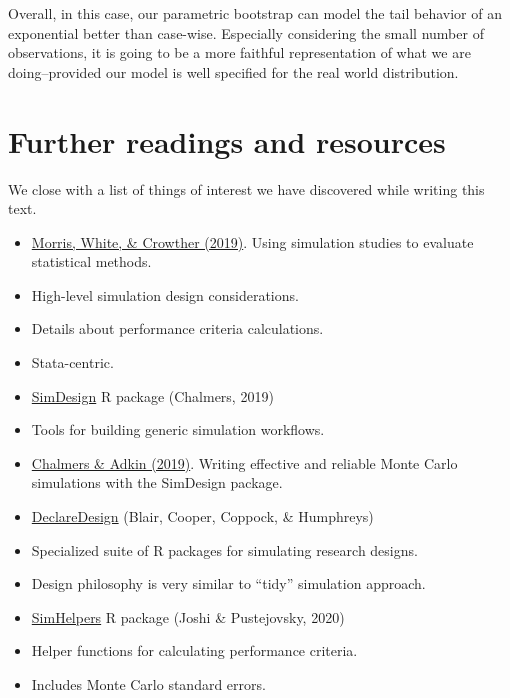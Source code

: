 \documentclass[
]{book}
\begin{document}
Overall, in this case, our parametric bootstrap can model the tail behavior of an exponential better than case-wise.
Especially considering the small number of observations, it is going to be a more faithful representation of what we are doing--provided our model is well specified for the real world distribution.

\hypertarget{further-readings-and-resources}{%
\chapter{Further readings and resources}\label{further-readings-and-resources}}

We close with a list of things of interest we have discovered while writing this text.

\begin{itemize}
\item
  \href{https://doi.org/10.1002/sim.8086}{Morris, White, \& Crowther (2019)}. Using simulation studies to evaluate statistical methods.
\item
  High-level simulation design considerations.
\item
  Details about performance criteria calculations.
\item
  Stata-centric.
\item
  \href{https://github.com/philchalmers/SimDesign/wiki}{SimDesign} R package (Chalmers, 2019)
\item
  Tools for building generic simulation workflows.
\item
  \href{http://www.tqmp.org/RegularArticles/vol16-4/p248/}{Chalmers \& Adkin (2019)}. Writing effective and reliable Monte Carlo simulations with the SimDesign package.
\item
  \href{https://declaredesign.org/}{DeclareDesign} (Blair, Cooper, Coppock, \& Humphreys)
\item
  Specialized suite of R packages for simulating research designs.
\item
  Design philosophy is very similar to ``tidy'' simulation approach.
\item
  \href{https://meghapsimatrix.github.io/simhelpers/index.html}{SimHelpers} R package (Joshi \& Pustejovsky, 2020)
\item
  Helper functions for calculating performance criteria.
\item
  Includes Monte Carlo standard errors.
\end{itemize}

  
\end{document}
